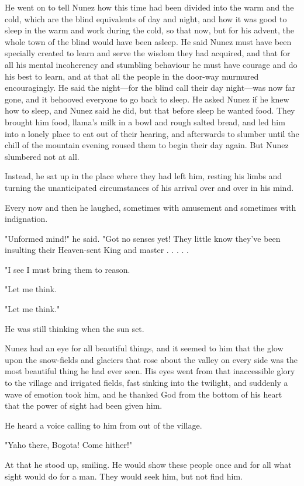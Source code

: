 \documentclass[submission]{sffms}
\begin{document}
He went on to tell Nunez how this time had been divided into the warm
and the cold, which are the blind equivalents of day and night, and
how it was good to sleep in the warm and work during the cold, so that
now, but for his advent, the whole town of the blind would have been
asleep. He said Nunez must have been specially created to learn and
serve the wisdom they had acquired, and that for all his mental
incoherency and stumbling behaviour he must have courage and do his
best to learn, and at that all the people in the door-way murmured
encouragingly. He said the night---for the blind call their day
night---was now far gone, and it behooved everyone to go back to
sleep. He asked Nunez if he knew how to sleep, and Nunez said he did,
but that before sleep he wanted food.  They brought him food, llama's
milk in a bowl and rough salted bread, and led him into a lonely place
to eat out of their hearing, and afterwards to slumber until the chill
of the mountain evening roused them to begin their day again.  But
Nunez slumbered not at all.

Instead, he sat up in the place where they had left him, resting his
limbs and turning the unanticipated circumstances of his arrival over
and over in his mind.

Every now and then he laughed, sometimes with amusement and sometimes
with indignation.

"Unformed mind!" he said. "Got no senses yet! They little know they've
been insulting their Heaven-sent King and master . . . . .

"I see I must bring them to reason.

"Let me think.

"Let me think."

He was still thinking when the sun set.

Nunez had an eye for all beautiful things, and it seemed to him that
the glow upon the snow-fields and glaciers that rose about the valley
on every side was the most beautiful thing he had ever seen. His eyes
went from that inaccessible glory to the village and irrigated fields,
fast sinking into the twilight, and suddenly a wave of emotion took
him, and he thanked God from the bottom of his heart that the power of
sight had been given him.

He heard a voice calling to him from out of the village.

"Yaho there, Bogota! Come hither!"

At that he stood up, smiling. He would show these people once and for
all what sight would do for a man. They would seek him, but not find
him.
\end{document}
